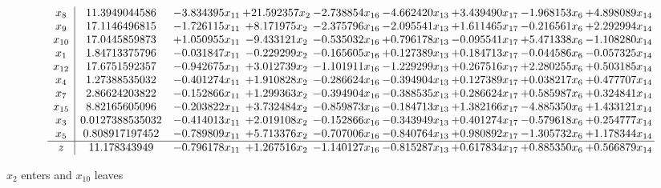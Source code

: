 \documentclass[10pt]{article}
\begin{document}
 \[\begin{array}{c| c c@{\hskip 2pt} c@{\hskip 2pt} c@{\hskip 2pt} c@{\hskip 2pt} c@{\hskip 2pt} c@{\hskip 2pt} c@{\hskip 2pt} }
 x_{8}   &  11.3949044586 & -3.834395 x_{11} & + 21.592357 x_{2} & -2.738854 x_{16} & -4.662420 x_{13} & + 3.439490 x_{17} & -1.968153 x_{6} & + 4.898089 x_{14}\\
 x_{9}   &  17.1146496815 & -1.726115 x_{11} & + 8.171975 x_{2} & -2.375796 x_{16} & -2.095541 x_{13} & + 1.611465 x_{17} & -0.216561 x_{6} & + 2.292994 x_{14}\\
 x_{10}   &  17.0445859873 & + 1.050955 x_{11} & -9.433121 x_{2} & -0.535032 x_{16} & + 0.796178 x_{13} & -0.095541 x_{17} & + 5.471338 x_{6} & -1.108280 x_{14}\\
 x_{1}   &  1.84713375796 & -0.031847 x_{11} & -0.229299 x_{2} & -0.165605 x_{16} & + 0.127389 x_{13} & + 0.184713 x_{17} & -0.044586 x_{6} & -0.057325 x_{14}\\
 x_{12}   &  17.6751592357 & -0.942675 x_{11} & + 3.012739 x_{2} & -1.101911 x_{16} & -1.229299 x_{13} & + 0.267516 x_{17} & + 2.280255 x_{6} & + 0.503185 x_{14}\\
 x_{4}   &  1.27388535032 & -0.401274 x_{11} & + 1.910828 x_{2} & -0.286624 x_{16} & -0.394904 x_{13} & + 0.127389 x_{17} & + 0.038217 x_{6} & + 0.477707 x_{14}\\
 x_{7}   &  2.86624203822 & -0.152866 x_{11} & + 1.299363 x_{2} & -0.394904 x_{16} & -0.388535 x_{13} & + 0.286624 x_{17} & + 0.585987 x_{6} & + 0.324841 x_{14}\\
 x_{15}   &  8.82165605096 & -0.203822 x_{11} & + 3.732484 x_{2} & -0.859873 x_{16} & -0.184713 x_{13} & + 1.382166 x_{17} & -4.885350 x_{6} & + 1.433121 x_{14}\\
 x_{3}   &  0.0127388535032 & -0.414013 x_{11} & + 2.019108 x_{2} & -0.152866 x_{16} & -0.343949 x_{13} & + 0.401274 x_{17} & -0.579618 x_{6} & + 0.254777 x_{14}\\
 x_{5}   &  0.808917197452 & -0.789809 x_{11} & + 5.713376 x_{2} & -0.707006 x_{16} & -0.840764 x_{13} & + 0.980892 x_{17} & -1.305732 x_{6} & + 1.178344 x_{14}\\
\hline
z    &  11.178343949 & -0.796178 x_{11} & + 1.267516 x_{2} & -1.140127 x_{16} & -0.815287 x_{13} & + 0.617834 x_{17} & + 0.885350 x_{6} & + 0.566879 x_{14}\\
\end{array}\]


 $ x_{2} $ enters and $ x_{10} $ leaves 
\end{document}
